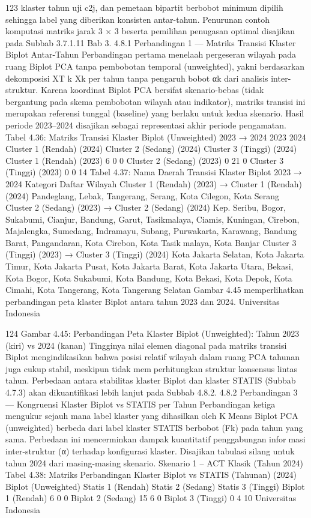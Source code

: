 123
klaster tahun uji c2j, dan pemetaan bipartit berbobot minimum dipilih sehingga label
yang diberikan konsisten antar-tahun. Penurunan contoh komputasi matriks jarak 3 × 3
beserta pemilihan penugasan optimal disajikan pada Subbab 3.7.1.11 Bab 3.
4.8.1 Perbandingan 1 — Matriks Transisi Klaster Biplot Antar-Tahun
Perbandingan pertama menelaah pergeseran wilayah pada ruang Biplot PCA tanpa
pembobotan temporal (unweighted), yakni berdasarkan dekomposisi XT
k Xk per tahun
tanpa pengaruh bobot αk dari analisis inter-struktur. Karena koordinat Biplot PCA bersifat
skenario-bebas (tidak bergantung pada skema pembobotan wilayah atau indikator), matriks
transisi ini merupakan referensi tunggal (baseline) yang berlaku untuk kedua skenario.
Hasil periode 2023–2024 disajikan sebagai representasi akhir periode pengamatan.
Tabel 4.36: Matriks Transisi Klaster Biplot (Unweighted) 2023 → 2024
2023
2024 Cluster 1 (Rendah) (2024) Cluster 2 (Sedang) (2024) Cluster 3 (Tinggi) (2024)
Cluster 1 (Rendah) (2023) 6 0 0
Cluster 2 (Sedang) (2023) 0 21 0
Cluster 3 (Tinggi) (2023) 0 0 14
Tabel 4.37: Nama Daerah Transisi Klaster Biplot 2023 → 2024
Kategori Daftar Wilayah
Cluster 1 (Rendah)
(2023) → Cluster 1
(Rendah) (2024)
Pandeglang, Lebak, Tangerang, Serang, Kota Cilegon, Kota
Serang
Cluster 2 (Sedang)
(2023) → Cluster 2
(Sedang) (2024)
Kep. Seribu, Bogor, Sukabumi, Cianjur, Bandung, Garut,
Tasikmalaya, Ciamis, Kuningan, Cirebon, Majalengka,
Sumedang, Indramayu, Subang, Purwakarta, Karawang,
Bandung Barat, Pangandaran, Kota Cirebon, Kota Tasikmalaya, Kota Banjar
Cluster 3 (Tinggi)
(2023) → Cluster 3
(Tinggi) (2024)
Kota Jakarta Selatan, Kota Jakarta Timur, Kota Jakarta Pusat,
Kota Jakarta Barat, Kota Jakarta Utara, Bekasi, Kota Bogor,
Kota Sukabumi, Kota Bandung, Kota Bekasi, Kota Depok,
Kota Cimahi, Kota Tangerang, Kota Tangerang Selatan
Gambar 4.45 memperlihatkan perbandingan peta klaster Biplot antara tahun 2023 dan
2024.
Universitas Indonesia

124
Gambar 4.45: Perbandingan Peta Klaster Biplot (Unweighted): Tahun 2023 (kiri) vs 2024
(kanan)
Tingginya nilai elemen diagonal pada matriks transisi Biplot mengindikasikan bahwa
posisi relatif wilayah dalam ruang PCA tahunan juga cukup stabil, meskipun tidak memperhitungkan struktur konsensus lintas tahun. Perbedaan antara stabilitas klaster Biplot
dan klaster STATIS (Subbab 4.7.3) akan dikuantifikasi lebih lanjut pada Subbab 4.8.2.
4.8.2 Perbandingan 3 — Kongruensi Klaster Biplot vs STATIS per Tahun
Perbandingan ketiga mengukur sejauh mana label klaster yang dihasilkan oleh KMeans Biplot PCA (unweighted) berbeda dari label klaster STATIS berbobot (Fk) pada
tahun yang sama. Perbedaan ini mencerminkan dampak kuantitatif penggabungan informasi inter-struktur (α) terhadap konfigurasi klaster. Disajikan tabulasi silang untuk tahun
2024 dari masing-masing skenario.
Skenario 1 – ACT Klasik (Tahun 2024)
Tabel 4.38: Matriks Perbandingan Klaster Biplot vs STATIS (Tahunan) (2024)
Biplot (Unweighted) Statis 1 (Rendah) Statis 2 (Sedang) Statis 3 (Tinggi)
Biplot 1 (Rendah) 6 0 0
Biplot 2 (Sedang) 15 6 0
Biplot 3 (Tinggi) 0 4 10
Universitas Indonesia


